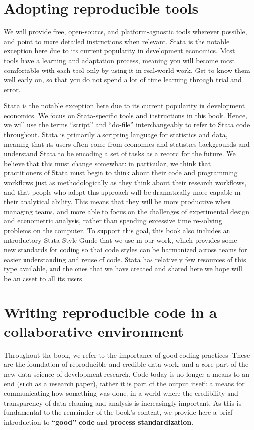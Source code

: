 \section{Adopting reproducible tools}
We will provide free, open-source, and platform-agnostic tools wherever possible,
and point to more detailed instructions when relevant.
Stata is the notable exception here due to its current popularity in development economics.
Most tools have a learning and adaptation process,
meaning you will become most comfortable with each tool
only by using it in real-world work.
Get to know them well early on,
so that you do not spend a lot of time learning through trial and error.

Stata is the notable exception here due to its current popularity in development economics.
We focus on Stata-specific tools and instructions in this book.
Hence, we will use the terms ``script'' and ``do-file''
interchangeably to refer to Stata code throughout.
Stata is primarily a scripting language for statistics and data,
meaning that its users often come from economics and statistics backgrounds
and understand Stata to be encoding a set of tasks as a record for the future.
We believe that this must change somewhat:
in particular, we think that practitioners of Stata
must begin to think about their code and programming workflows
just as methodologically as they think about their research workflows,
and that people who adopt this approach will be dramatically
more capable in their analytical ability.
This means that they will be more productive when managing teams,
and more able to focus on the challenges of experimental design
and econometric analysis, rather than spending excessive time
re-solving problems on the computer.
To support this goal, this book also includes
an introductory Stata Style Guide
that we use in our work, which provides
some new standards for coding so that code styles
can be harmonized across teams for easier understanding and reuse of code.
Stata has relatively few resources of this type available,
and the ones that we have created and shared here
we hope will be an asset to all its users.


\section{Writing reproducible code in a collaborative environment}
Throughout the book, we refer to the importance of good coding practices.
These are the foundation of reproducible and credible data work,
and a core part of the new data science of development research.
Code today is no longer a means to an end (such as a research paper),
rather it is part of the output itself: a means for communicating how something was done,
in a world where the credibility and transparency of data cleaning and analysis is increasingly important.
As this is fundamental to the remainder of the book's content,
we provide here a brief introduction to \textbf{``good'' code} and \textbf{process standardization}.


